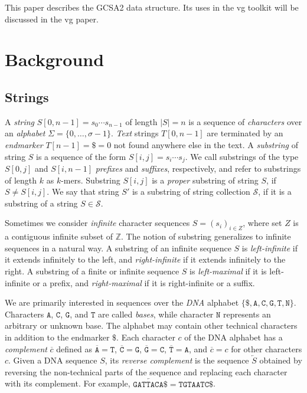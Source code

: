\documentclass[twoside,leqno,twocolumn]{article}
\newcommand{\set}[1]{\ensuremath{\{ #1 \}}}
\newcommand{\abs}[1]{\ensuremath{\lvert #1 \rvert}}
\newcommand{\baseA}{\mathtt{A}}
\newcommand{\baseC}{\mathtt{C}}
\newcommand{\baseG}{\mathtt{G}}
\newcommand{\baseT}{\mathtt{T}}
\newcommand{\baseN}{\mathtt{N}}
\newcommand{\dnacomp}[1]{\ensuremath{\overline{#1}}}
\newcommand{\revcomp}[1]{\ensuremath{\overleftarrow{#1}}}
\newcommand{\kmer}[1]{$#1$\nobreakdash-mer}
\begin{document}
This paper describes the GCSA2 data structure. Its uses in the vg toolkit will be discussed in the vg paper.


\section{Background}

\subsection{Strings}\label{sect:strings}

A \emph{string} $S[0, n-1] = s_{0} \dotsm s_{n-1}$ of length $\abs{S} = n$ is a sequence of \emph{characters} over an \emph{alphabet} $\Sigma = \set{0, \dotsc, \sigma - 1}$. \emph{Text} strings $T[0, n-1]$ are terminated by an \emph{endmarker} $T[n-1] = \$ = 0$ not found anywhere else in the text. A \emph{substring} of string $S$ is a sequence of the form $S[i, j] = s_{i} \dotsm s_{j}$. We call substrings of the type $S[0, j]$ and $S[i, n-1]$ \emph{prefixes} and \emph{suffixes}, respectively, and refer to substrings of length $k$ as \kmer{k}s. Substring $S[i, j]$ is a \emph{proper} substring of string $S$, if $S \ne S[i, j]$. We say that string $S'$ is a substring of string collection $\mathcal{S}$, if it is a substring of a string $S \in \mathcal{S}$.

Sometimes we consider \emph{infinite} character sequences $S = (s_{i})_{i \in Z}$, where set $Z$ is a contiguous infinite subset of $\mathbb{Z}$. The notion of substring generalizes to infinite sequences in a natural way. A substring of an infinite sequence $S$ is \emph{left-infinite} if it extends infinitely to the left, and \emph{right-infinite} if it extends infinitely to the right. A substring of a finite or infinite sequence $S$ is \emph{left-maximal} if it is left-infinite or a prefix, and \emph{right-maximal} if it is right-infinite or a suffix.

We are primarily interested in sequences over the \emph{DNA} alphabet $\set{\$, \baseA, \baseC, \baseG, \baseT, \baseN}$. Characters $\baseA$, $\baseC$, $\baseG$, and $\baseT$ are called \emph{bases}, while character $\baseN$ represents an arbitrary or unknown base. The alphabet may contain other technical characters in addition to the endmarker $\$$. Each character $c$ of the DNA alphabet has a \emph{complement} $\dnacomp{c}$ defined as $\dnacomp{\baseA} = \baseT$, $\dnacomp{\baseC} = \baseG$, $\dnacomp{\baseG} = \baseC$, $\dnacomp{\baseT} = \baseA$, and $\dnacomp{c} = c$ for other characters $c$. Given a DNA sequence $S$, its \emph{reverse complement} is the sequence $\revcomp{S}$ obtained by reversing the non-technical parts of the sequence and replacing each character with its complement. For example, $\revcomp{\mathtt{GATTACA}\$} = \mathtt{TGTAATC}\$$.
\end{document}
